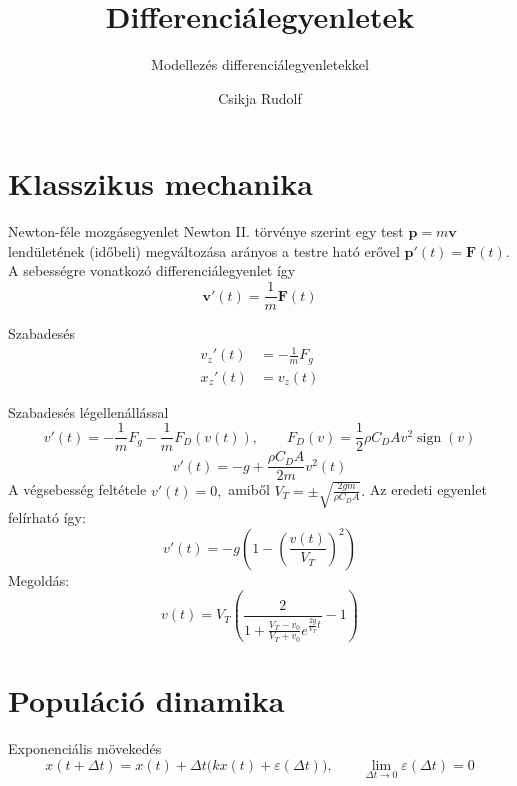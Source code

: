 \documentclass[10pt]{beamer}
\title{Differenciálegyenletek}
\subtitle{Modellezés differenciálegyenletekkel}
\date{}
\author{Csikja Rudolf}
\institute{Budapesti Műszaki és Gazdaságtudományi Egyetem\\Matemaikai Intézet, Analízis Tanszék}
\newcommand{\bp}[0]{\mathbf{p}}
\newcommand{\bv}[0]{\mathbf{v}}
\newcommand{\bF}[0]{\mathbf{F}}
\DeclareMathOperator{\sign}{sign}
\begin{document}
\maketitle



\section{Klasszikus mechanika}
\begin{frame}[t]{Newton-féle mozgásegyenlet}
Newton II. törvénye szerint egy test $\bp=m\bv$ lendületének (időbeli) megváltozása
arányos a testre ható erővel $\bp'(t) = \bF(t).$
A sebességre vonatkozó differenciálegyenlet így
\[\bv'(t) = \frac{1}{m}\bF(t)\]
\end{frame}

\begin{frame}[t]{Szabadesés}
\[
\begin{split}
v_z'(t)   &= -\frac{1}{m}F_g\\
x_z'(t) &= v_z(t)
\end{split}
\]
\end{frame}

\begin{frame}[t]{Szabadesés légellenállással}
\[
v'(t) = -\frac{1}{m}F_g - \frac{1}{m}F_D(v(t)), \qquad 
F_D(v) = \frac{1}{2}\rho C_D A v^2 \sign(v)
\]
\[v'(t) = -g + \frac{\rho C_D A}{2m} v^2(t)\]
A végsebesség feltétele $v'(t) = 0,$ amiből $V_{T} = \pm\sqrt{\frac{2 g m}{\rho C_D A}}.$
Az eredeti egyenlet felírható így:
\[v'(t) = -g\left(1-\left(\frac{v(t)}{V_T}\right)^2\right)\]
Megoldás:
\[v(t) = V_T \left(\frac{2}{ 1 + \frac{V_T - v_0}{V_T + v_0}e^{\frac{2g}{V_T}t }} - 1\right)\]
\end{frame}

\section{Populáció dinamika}
\begin{frame}[t]{Exponenciális mövekedés}
\[x(t+\Delta t) = x(t) +  \Delta t\big(k x(t) +  \varepsilon(\Delta t)\big), \qquad \lim_{\Delta t\to 0} \varepsilon(\Delta t) = 0\]
\end{frame}
\end{document}
